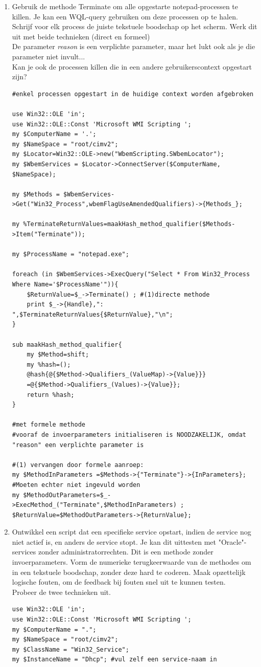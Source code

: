 \documentclass[11pt,a4paper]{report}
\begin{document}
\begin{enumerate}[resume]
	\item Gebruik de methode Terminate om alle opgestarte notepad-processen te killen. Je kan een WQL-query gebruiken om deze processen op te halen. Schrijf voor elk process de juiste tekstuele boodschap op het scherm. Werk dit uit met beide technieken (direct en formeel)
	\\De parameter \textit{reason} is een verplichte parameter, maar het lukt ook als je die parameter niet invult...
	\\Kan je ook de processen killen die in een andere gebruikerscontext opgestart zijn?
	\begin{lstlisting}
#enkel processen opgestart in de huidige context worden afgebroken

use Win32::OLE 'in';
use Win32::OLE::Const 'Microsoft WMI Scripting ';
my $ComputerName = '.';
my $NameSpace = "root/cimv2";
my $Locator=Win32::OLE->new("WbemScripting.SWbemLocator");
my $WbemServices = $Locator->ConnectServer($ComputerName, $NameSpace);

my $Methods = $WbemServices->Get("Win32_Process",wbemFlagUseAmendedQualifiers)->{Methods_};

my %TerminateReturnValues=maakHash_method_qualifier($Methods->Item("Terminate"));

my $ProcessName = "notepad.exe";

foreach (in $WbemServices->ExecQuery("Select * From Win32_Process Where Name='$ProcessName'")){
	$ReturnValue=$_->Terminate() ; #(1)directe methode
	print $_->{Handle},": ",$TerminateReturnValues{$ReturnValue},"\n";
}

sub maakHash_method_qualifier{
	my $Method=shift;
	my %hash=();
	@hash{@{$Method->Qualifiers_(ValueMap)->{Value}}}
	=@{$Method->Qualifiers_(Values)->{Value}};
	return %hash;
}

#met formele methode
#vooraf de invoerparameters initialiseren is NOODZAKELIJK, omdat "reason" een verplichte parameter is

#(1) vervangen door formele aanroep:
my $MethodInParameters =$Methods->{"Terminate"}->{InParameters}; #Moeten echter niet ingevuld worden
my $MethodOutParameters=$_->ExecMethod_("Terminate",$MethodInParameters) ;
$ReturnValue=$MethodOutParameters->{ReturnValue};
	\end{lstlisting}
	\item Ontwikkel een script dat een specifieke service opstart, indien de service nog niet actief is, en anders de service stopt. Je kan dit uittesten met "Oracle"-services zonder administratorrechten. Dit is een methode zonder invoerparameters. Vorm de numerieke terugkeerwaarde van de methodes om in een tekstuele boodschap, zonder deze hard te coderen. Maak opzettelijk logische fouten, om de feedback bij fouten snel uit te kunnen testen.
	\\Probeer de twee technieken uit.
	\begin{lstlisting}
use Win32::OLE 'in';
use Win32::OLE::Const 'Microsoft WMI Scripting ';
my $ComputerName = ".";
my $NameSpace = "root/cimv2";
my $ClassName = "Win32_Service";
my $InstanceName = "Dhcp"; #vul zelf een service-naam in


\end{lstlisting}
\end{enumerate}
\end{document}
